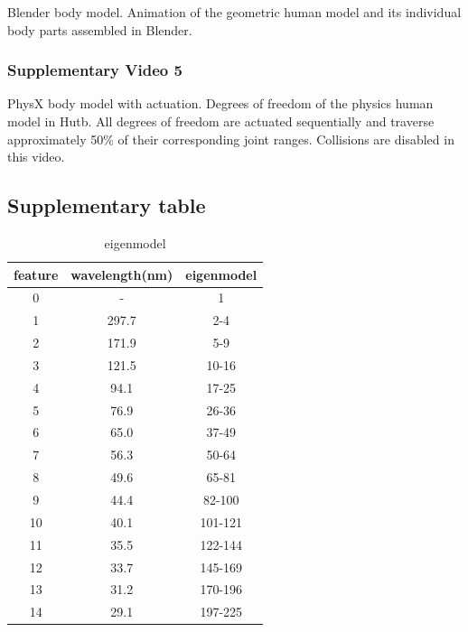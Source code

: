 \documentclass[sn-mathphys-num]{sn-jnl}%
\theoremstyle{thmstyleone}%
\theoremstyle{thmstyletwo}%
\theoremstyle{thmstylethree}%
\begin{document}
\begin{appendices}
Blender body model. 
Animation of the geometric human model and its individual body parts assembled in Blender.

\subsubsection{Supplementary Video 5} \label{sec:sup_2_3}

PhysX body model with actuation. 
Degrees of freedom of the physics human model in Hutb. 
All degrees of freedom are actuated sequentially and traverse approximately 50\% of their corresponding joint ranges. 
Collisions are disabled in this video.




\subsection{Supplementary table}\label{secA1}

\begin{table}[htbp]
	\centering
	\small
	\caption{eigenmodel}
	\begin{tabular}{ccc}
		\toprule
		feature         &        wavelength(nm)  & eigenmodel     \\
		\midrule
		0      &   -      &      1  \\
		1      &   297.7      &      2-4  \\
		2      &   171.9      &      5-9  \\
		3      &   121.5      &      10-16  \\
		4      &   94.1      &      17-25  \\
		5      &   76.9      &      26-36  \\
		6      &   65.0      &      37-49  \\
		7      &   56.3      &      50-64  \\
		8      &   49.6      &      65-81  \\
		9      &   44.4      &      82-100  \\
		10      &   40.1      &      101-121  \\
		11      &   35.5      &      122-144  \\
		12      &   33.7      &      145-169  \\
		13      &   31.2      &      170-196  \\
		14      &   29.1      &      197-225  \\
		
		\bottomrule
	\end{tabular}%
	\label{tab:spatial_wavelength}%
\end{table}%



\end{appendices}
\end{document}
